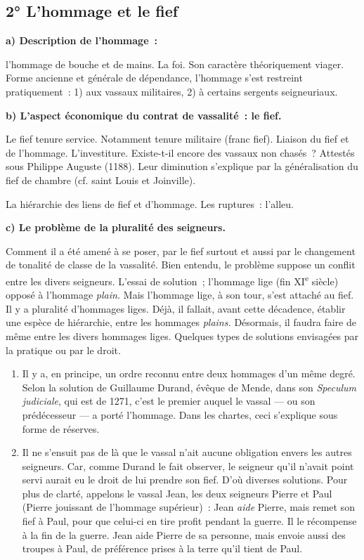 \documentclass[french,twoside]{book} %
\newcommand{\labelchar}[1]{\textbf{\color{rubric} #1}}
\begin{document}
\subsection[{2° L’hommage et le fief}]{2° L’hommage et le fief}
\noindent \labelchar{a) Description de l’hommage :}\par
l’hommage de bouche et de mains. La foi. Son caractère théoriquement viager. Forme ancienne et générale de dépendance, l’hommage s’est restreint pratiquement : 1) aux vassaux militaires, 2) à certains sergents seigneuriaux.\par
\bigbreak
\noindent \labelchar{b) L’aspect économique du contrat de vassalité : le fief.}\par
 Le fief tenure service. Notamment tenure militaire (franc fief). Liaison du fief et de l’hommage. L’investiture. Existe-t-il encore des vassaux non chasés ? Attestés sous Philippe Auguste (1188). Leur diminution s’explique par la généralisation du fief de chambre (cf. saint Louis et Joinville).\par
La hiérarchie des liens de fief et d’hommage. Les ruptures : l’alleu.\par
\bigbreak
\noindent \labelchar{c) Le problème de la pluralité des seigneurs.}\par
Comment il a été amené à se poser, par le fief surtout et aussi par le changement de tonalité de classe de la vassalité. Bien entendu, le problème suppose un conflit entre les divers seigneurs. L’essai de solution ; l’hommage lige (fin XI\textsuperscript{e} siècle) opposé à l’hommage {\itshape plain.} Mais l’hommage lige, à son tour, s’est attaché au fief. Il y a pluralité d’hommages liges. Déjà, il fallait, avant cette décadence, établir une espèce de hiérarchie, entre les hommages {\itshape plains.} Désormais, il faudra faire de même entre les divers hommages liges. Quelques types de solutions envisagées par la pratique ou par le droit.\par

\begin{enumerate}[itemsep=0pt,]
\item Il y a, en principe, un ordre reconnu entre deux hommages d’un même degré. Selon la solution de Guillaume Durand, évêque de Mende, dans son {\itshape Speculum judiciale}, qui est de 1271, c’est le premier auquel le vassal — ou son prédécesseur — a porté l’hommage. Dans les chartes, ceci s’explique sous forme de réserves.
\item Il ne s’ensuit pas de là que le vassal n’ait aucune obligation envers les autres seigneurs. Car, comme Durand le fait observer, le seigneur qu’il n’avait point servi aurait eu le droit de lui prendre son fief. D’où diverses solutions. Pour plus de clarté, appelons le vassal Jean, les deux seigneurs Pierre et Paul (Pierre jouissant de  
\label{p66} l’hommage supérieur) : Jean \emph{aide} Pierre, mais remet son fief à Paul, pour que celui-ci en tire profit pendant la guerre. Il le récompense à la fin de la guerre. Jean aide Pierre de sa personne, mais envoie aussi des troupes à Paul, de préférence prises à la terre qu’il tient de Paul.
\end{enumerate}
\end{document}
